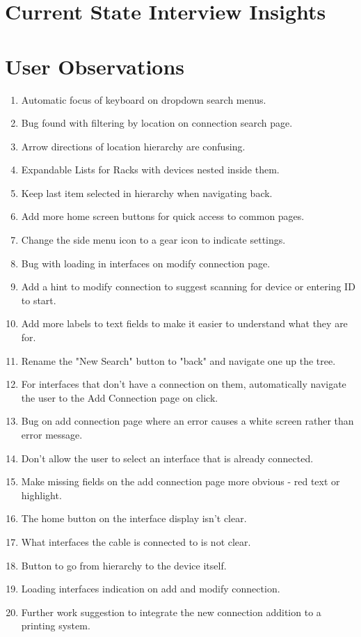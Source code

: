 \documentclass [11pt,a4paper]{article}
\begin{document}
\section{Current State Interview Insights}
\label{sec:current_state_interview_takeaways}


\section{User Observations }
\label{sec:appendix_observations}
\begin{enumerate}
    \item Automatic focus of keyboard on dropdown search menus.
    \item Bug found with filtering by location on connection search page.
    \item Arrow directions of location hierarchy are confusing.
    \item Expandable Lists for Racks with devices nested inside them.
    \item Keep last item selected in hierarchy when navigating back.
    \item Add more home screen buttons for quick access to common pages.
    \item Change the side menu icon to a gear icon to indicate settings.
    \item Bug with loading in interfaces on modify connection page.
    \item Add a hint to modify connection to suggest scanning for device or entering ID to start.
    \item Add more labels to text fields to make it easier to understand what they are for.
    \item Rename the "New Search" button to "back" and navigate one up the tree. 
    \item For interfaces that don't have a connection on them, automatically navigate the user to the Add Connection page on click.
    \item Bug on add connection page where an error causes a white screen rather than error message.
    \item Don't allow the user to select an interface that is already connected.
    \item Make missing fields on the add connection page more obvious - red text or highlight.
    \item The home button on the interface display isn't clear. 
    \item What interfaces the cable is connected to is not clear.
    \item Button to go from hierarchy to the device itself. 
    \item Loading interfaces indication on add and modify connection.
    \item Further work suggestion to integrate the new connection addition to a printing system.
\end{enumerate}
\end{document}
